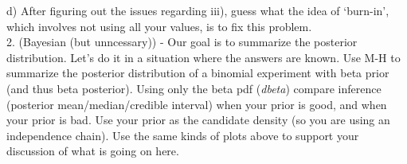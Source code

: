 \documentclass{article}
\begin{document}
d) After figuring out the issues regarding iii), guess what the idea of `burn-in', which involves not using all your values, is to fix this problem.\\[20pt]
2. (Bayesian (but unncessary)) - Our goal is to summarize the posterior distribution.  Let's do it in a situation where the answers are known.  Use M-H to summarize the posterior distribution of a binomial experiment with beta prior (and thus beta posterior).  Using only the beta pdf ({\it dbeta}) compare inference (posterior mean/median/credible interval) when your prior is good, and when your prior is bad.  Use your prior as the candidate density (so you are using an independence chain).  Use the same kinds of plots above to support your discussion of what is going on here.      
\end{document}
